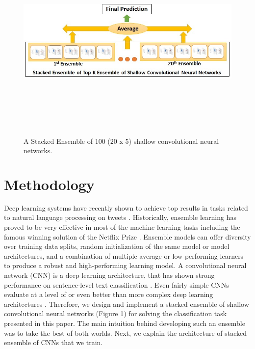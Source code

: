 \documentclass[conference]{IEEEtran}
\begin{document}
\begin{figure}[htbp]
	\centering
	\includegraphics[width=12cm,height=10cm,keepaspectratio]{StackedCNN.jpg}
	\caption{A Stacked Ensemble of 100 (20 x 5) shallow convolutional neural networks.}
	\label{stackedcnn}
\end{figure}


\section{Methodology}
Deep learning systems have recently shown to achieve top results in tasks related to natural language processing on tweets \cite{rosenthal2017semeval}. Historically, ensemble learning has proved to be very effective in most of the machine learning tasks including the famous winning solution of the Netflix Prize \cite{bell2010all}. Ensemble models can offer diversity over training data splits, random initialization of the same model or model architectures, and a combination of multiple average or low performing learners to produce a robust and high-performing learning model. A convolutional neural network (CNN) is a deep learning architecture, that has shown strong performance on sentence-level text classification \cite{kim2014convolutional}. Even fairly simple CNNs evaluate at a level of or even better than more complex deep learning architectures \cite{le2017convolutional}. Therefore, we design and implement a stacked ensemble of shallow convolutional neural networks (Figure 1) for solving the classification task presented in this paper. The main intuition behind developing such an ensemble was to take the best of both worlds. Next, we explain the architecture of stacked ensemble of CNNs that we train.
\end{document}
